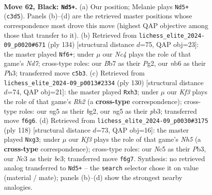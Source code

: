 \documentclass[11pt]{article}
\begin{document}
\clearpage

\begin{figure}[p]\centering
\begin{subfigure}{0.46\textwidth}\centering
\resizebox{\linewidth}{!}{%
\newchessgame
\chessboard[
  setfen={8/Pb6/1N3k2/2n3N1/1p3P2/1Pn1K1PB/7P/R7 b - - 6 62},
  showmover=false,
  pgfstyle=straightmove, color=movearrow, markmove={c3-d5}
]}
\caption{}
\end{subfigure}\hfill
\begin{subfigure}{0.46\textwidth}\centering
\resizebox{\linewidth}{!}{%
\newchessgame
\chessboard[
  setfen={8/3N1p2/6pB/3kp2p/3b4/3K3P/6P1/8 w - - 0 68},
  showmover=false,
  pgfstyle=straightmove, color=movearrow, markmove={d7-f6}
]}
\caption{}
\end{subfigure}
\\[4pt]
\begin{subfigure}{0.46\textwidth}\centering
\resizebox{\linewidth}{!}{%
\newchessgame
\chessboard[
  setfen={5k2/5p2/4pN2/4Pp2/p7/1pK3Pp/6bR/2b5 w - - 0 66},
  showmover=false,
  pgfstyle=straightmove, color=movearrow, markmove={h2-h3}
]}
\caption{}
\end{subfigure}\hfill
\begin{subfigure}{0.46\textwidth}\centering
\resizebox{\linewidth}{!}{%
\newchessgame
\chessboard[
  setfen={8/8/2N1p3/6kN/1p2P1pp/1Pb3r1/P3K3/8 w - - 10 60},
  showmover=false,
  pgfstyle=straightmove, color=movearrow, markmove={h5-g3}
]}
\caption{}
\end{subfigure}
\caption{\textbf{Move 62, Black: \texttt{Nd5+}.} (a) Our position; Melanie plays \texttt{Nd5+} (\texttt{c3d5}). Panels (b)--(d) are the retrieved master positions whose correspondence most drove this move (highest QAP objective among those that transfer to it). (b) Retrieved from \texttt{lichess\_elite\_2024-09\_p0020\#671} (ply 134) [structural distance $d$=75, QAP obj=23]: the master played \texttt{Nf6+}; under $\mu$ our \emph{Nc4} plays the role of that game's \emph{Nd7}; cross-type roles: our \emph{B}b7 as their \emph{P}g2, our \emph{n}b6 as their \emph{P}h3; transferred move \texttt{c5b3}. (c) Retrieved from \texttt{lichess\_elite\_2024-09\_p0013\#2334} (ply 130) [structural distance $d$=74, QAP obj=21]: the master played \texttt{Rxh3}; under $\mu$ our \emph{Kf3} plays the role of that game's \emph{Rh2} (a \textbf{cross-type} correspondence); cross-type roles: our \emph{n}g5 as their \emph{b}g2, our \emph{n}g5 as their \emph{p}b3; transferred move \texttt{f6g6}. (d) Retrieved from \texttt{lichess\_elite\_2024-09\_p0030\#3175} (ply 118) [structural distance $d$=73, QAP obj=16]: the master played \texttt{Nxg3}; under $\mu$ our \emph{Kf3} plays the role of that game's \emph{Nh5} (a \textbf{cross-type} correspondence); cross-type roles: our \emph{N}c5 as their \emph{P}b3, our \emph{N}c3 as their \emph{b}c3; transferred move \texttt{f6g7}. Synthesis: no retrieved analog transferred to \texttt{Nd5+} -- the \texttt{search} selector chose it on value (material / mate); panels (b)--(d) show the strongest nearby analogies.}
\label{fig:thought-m123}
\end{figure}
\end{document}
